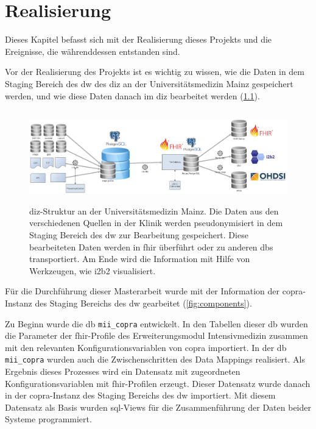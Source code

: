 \chapter{Realisierung} \label{ch:results}

Dieses Kapitel befasst sich mit der Realisierung dieses Projekts und die Ereignisse, die währenddessen entstanden sind.

Vor der Realisierung des Projekts ist es wichtig zu wissen, wie die Daten in dem Staging Bereich des \ac{dw} des \ac{diz} an der Universitätsmedizin Mainz gespeichert werden, und wie diese Daten danach im \ac{diz} bearbeitet werden (\ref{fig:dizummz}).

\begin{figure}[ht]
	\centering
	\includegraphics[height=4cm]{figures/diz_ummz}
	\caption[\acs{diz}-Struktur an der Universitätsmedizin Mainz] {\acs{diz}-Struktur an der Universitätsmedizin Mainz. Die Daten aus den verschiedenen Quellen in der Klinik werden pseudonymisiert in dem Staging Bereich des \ac{dw} zur Bearbeitung gespeichert. Diese bearbeiteten Daten werden in \ac{fhir} überführt oder zu anderen \acp{db} transportiert. Am Ende wird die Information mit Hilfe von Werkzeugen, wie i2b2 visualisiert.}
	\label{fig:dizummz}
\end{figure}

 Für die Durchführung dieser Masterarbeit wurde mit der Information der \ac{copra}-Instanz des Staging Bereichs des \ac{dw} gearbeitet (\ref{fig:components}).

 Zu Beginn wurde die \ac{db} \texttt{mii\_copra} entwickelt. In den Tabellen dieser \ac{db} wurden die Parameter der \ac{fhir}-Profile des Erweiterungsmodul \glqq Intensivmedizin\grqq{} zusammen mit den relevanten Konfigurationsvariablen von \ac{copra} importiert. In der \ac{db} \texttt{mii\_copra} wurden auch die Zwischenschritten des Data Mappings realisiert. Als Ergebnis dieses Prozesses wird ein Datensatz mit zugeordneten Konfigurationsvariablen mit \ac{fhir}-Profilen erzeugt. Dieser Datensatz wurde danach in der \ac{copra}-Instanz des Staging Bereichs des \ac{dw} importiert. Mit diesem Datensatz als Basis wurden \ac{sql}-Views für die Zusammenführung der Daten beider Systeme programmiert.

